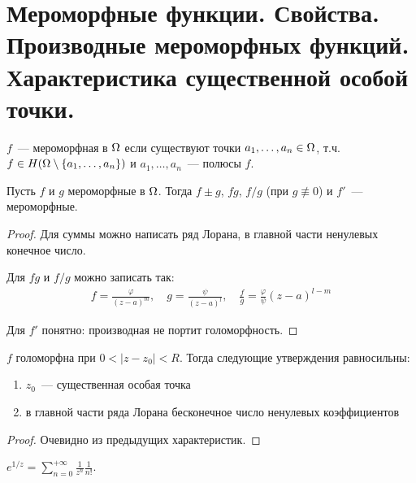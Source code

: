 \section{Мероморфные функции. Свойства. Производные мероморфных функций. Характеристика существенной особой точки.}

\begin{definition}
    $f$~--- мероморфная в $\Omega$ если
    существуют точки $a_1, \ldots, a_n \in \Omega$,
    т.ч. $f \in H(\Omega \setminus \left\{a_1, \ldots, a_n\right\})$
    и $a_1, \ldots, a_n$~--- полюсы $f$.
\end{definition}

\begin{properties}
    Пусть $f$ и $g$ мероморфные в $\Omega$.
    Тогда $f \pm g$, $fg$, $f/g$ (при $g \not\equiv 0$)
    и $f'$~--- мероморфные.
\end{properties}

\begin{proof}
    Для суммы можно написать ряд Лорана, в главной части ненулевых конечное число.

    Для $fg$ и $f/g$ можно записать так:
    \begin{gather*}
        f = \frac{\varphi}{(z-a)^m}, \quad g = \frac{\psi}{(z-a)^l}, \quad \frac{f}{g} = \frac{\varphi}{\psi} (z-a)^{l-m}
    \end{gather*}

    Для $f'$ понятно: производная не портит голоморфность.
\end{proof}

\begin{theorem}

    $f$ голоморфна при $0 < |z-z_0| < R$. Тогда
    следующие утверждения равносильны:

    \begin{enumerate}
        \item $z_0$~--- существенная особая точка
        \item в главной части ряда Лорана бесконечное число ненулевых коэффициентов
    \end{enumerate}
\end{theorem}

\begin{proof}
    Очевидно из предыдущих характеристик.
\end{proof}

\begin{consequence}
    $e^{1/z} = \sum\limits_{n=0}^{+\infty} \frac{1}{z^n} \frac{1}{n!}$.
\end{consequence}

\newpage
